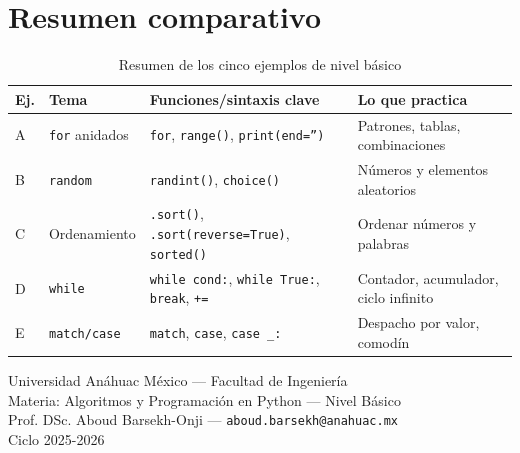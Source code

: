\documentclass[12pt,a4paper]{article}
\begin{document}
\newpage
\section*{Resumen comparativo}

\begin{table}[h!]
\centering
\renewcommand{\arraystretch}{1.5}
\begin{tabular}{|p{1.2cm}|p{3cm}|p{4cm}|p{5cm}|}
\hline
\rowcolor{anaDark!15}
\textbf{Ej.} & \textbf{Tema} & \textbf{Funciones/sintaxis clave} & \textbf{Lo que practica} \\
\hline
A & \texttt{for} anidados & \texttt{for}, \texttt{range()}, \texttt{print(end='')} & Patrones, tablas, combinaciones \\
\hline
B & \texttt{random} & \texttt{randint()}, \texttt{choice()} & Números y elementos aleatorios \\
\hline
C & Ordenamiento & \texttt{.sort()}, \texttt{.sort(reverse=True)}, \texttt{sorted()} & Ordenar números y palabras \\
\hline
D & \texttt{while} & \texttt{while cond:}, \texttt{while True:}, \texttt{break}, \texttt{+=} & Contador, acumulador, ciclo infinito \\
\hline
E & \texttt{match/case} & \texttt{match}, \texttt{case}, \texttt{case \_:} & Despacho por valor, comodín \\
\hline
\end{tabular}
\caption{Resumen de los cinco ejemplos de nivel básico}
\end{table}

\vspace{1.5em}
\begin{center}
  \small\color{gray}
  Universidad Anáhuac México — Facultad de Ingeniería\\
  Materia: Algoritmos y Programación en Python — Nivel Básico\\
  Prof. DSc. Aboud Barsekh-Onji — \texttt{aboud.barsekh@anahuac.mx}\\
  Ciclo 2025-2026
\end{center}
\end{document}
